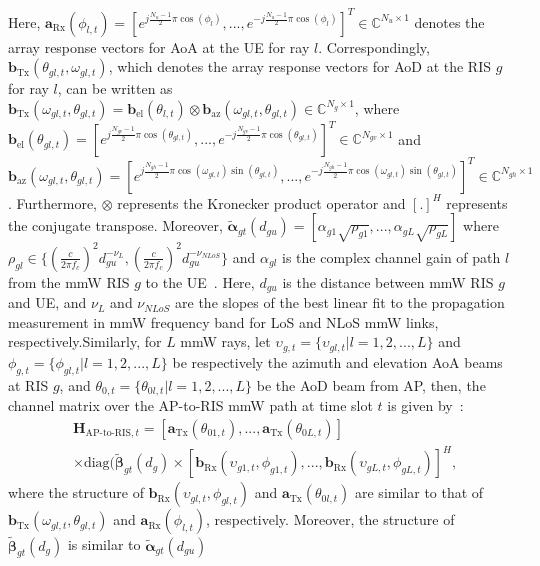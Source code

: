 \documentclass[conference]{IEEEtran}
\begin{document}
Here, $\boldsymbol{a}_{\text{Rx}}(\phi_{l,t})=[e^{j\frac{N_u-1}{2}\pi \cos({\phi}_{l})},...,e^{-j\frac{N_u-1}{2}\pi \cos({\phi}_{l})}]^T\in \mathbb{C}^{N_u \times 1}$ denotes the array response vectors for AoA at the UE for ray $l$. Correspondingly, $\boldsymbol{b}_{\text{Tx}}(\theta_{gl,t},\omega_{gl,t})$, which denotes the array response vectors for AoD at the RIS $g$ for ray $l$, can be written as $\boldsymbol{b}_{\text{Tx}}(\omega_{gl,t},\theta_{gl,t})= \boldsymbol{b}_{\text{el}}(\theta_{l,t}) \otimes \boldsymbol{b}_{\text{az}}(\omega_{gl,t},\theta_{gl,t})\in \mathbb{C}^{N_g \times 1}$, where $\boldsymbol{b}_{\text{el}}(\theta_{gl,t})=[e^{j\frac{N_{gv}-1}{2}\pi \cos(\theta_{gl,t})},...,e^{-j\frac{N_{gv}-1}{2}\pi \cos(\theta_{gl,t})}]^T \in \mathbb{C}^{N_{gv} \times 1}$ and $\boldsymbol{b}_{\text{az}}(\omega_{gl,t},\theta_{gl,t})=[e^{j\frac{N_{gh}-1}{2}\pi \cos(\omega_{gl,t}) \sin(\theta_{gl,t})},...,e^{-j\frac{N_{gh}-1}{2}\pi \cos(\omega_{gl,t}) \sin(\theta_{gl,t}) }]^T \in \mathbb{C}^{N_{gh} \times 1}$.
Furthermore, $\otimes$ represents the Kronecker product operator and $[.]^H$ represents the conjugate transpose. Moreover,
$\tilde{\boldsymbol{\alpha}}_{gt}(d_{gu})=[\alpha_{g1}\sqrt{\rho_{g1}},...,\alpha_{gL}\sqrt{\rho_{gL}}]$ where $\rho_{gl}\in \{ (\frac{c}{2\pi f_c})^2 d_{gu}^{-\nu_L}, (\frac{c}{2\pi f_c})^2 d_{gu}^{-\nu_{NLoS}}\}$ and $\alpha_{gl}$ is the complex channel gain of path $l$ from the mmW RIS $g$ to the UE~\cite{Shahmansoori2018}. Here, $d_{gu}$ is the distance between mmW RIS $g$ and UE, and $\nu_{L}$ and $\nu_{NLoS}$ are the slopes of the best linear fit to the propagation measurement in mmW frequency band for LoS and NLoS mmW links, respectively.Similarly, for $L$ mmW rays, let $\upsilon_{g,t}=\{\upsilon_{gl,t}|l=1,2,...,L\}$ and $\phi_{g,t}=\{\phi_{gl,t}|l=1,2,...,L\}$  be respectively the azimuth and elevation AoA beams at RIS $g$, and $\theta_{0,t}=\{\theta_{0l,t}|l=1,2,...,L\}$ be the AoD beam from AP, then, the channel matrix over the AP-to-RIS mmW path at time slot $t$ is given by~\cite{Shahmansoori2018}:
\begin{align}
&\boldsymbol{H}_{\text{AP-to-RIS},t}=
[\boldsymbol{a}_{\text{Tx}}(\theta_{01,t}),...,\boldsymbol{a}_{\text{Tx}}(\theta_{0L,t})] \nonumber \\ &
\times \text{diag}(\tilde{\boldsymbol{\beta}}_{gt}(d_{g}) \times
[\boldsymbol{b}_{\text{Rx}}(\upsilon_{g1,t},\phi_{g1,t}),...,\boldsymbol{b}_{\text{Rx}}(\upsilon_{gL,t},\phi_{gL,t})]^{H},
\label{AP2RIS}
\end{align}
where the structure of $\boldsymbol{b}_{\text{Rx}}(\upsilon_{gl,t},\phi_{gl,t})$ and $\boldsymbol{a}_{\text{Tx}}(\theta_{0l,t})$ are similar to that of $\boldsymbol{b}_{\text{Tx}}(\omega_{gl,t},\theta_{gl,t})$ and $\boldsymbol{a}_{\text{Rx}}(\phi_{l,t})$, respectively. Moreover, the structure of  $\tilde{\boldsymbol{\beta}}_{gt}(d_{g})$ is similar to  $\tilde{\boldsymbol{\alpha}}_{gt}(d_{gu})$
\end{document}
